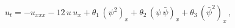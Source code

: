 \begin{equation*}
  u_t =- u_{xxx} - 12\,u\,u_x + \theta_1\,\left(\psi^2\right)_x+ \theta_2\,\left(\psi\,\bar{\psi}\right)_x+ \theta_3\,\left(\bar{\psi}^2\right)_x\,,
\end{equation*}

